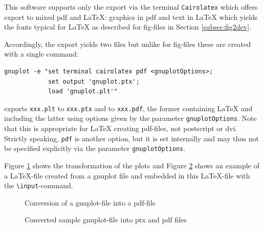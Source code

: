 \documentclass[12pt]{article}
\begin{document}
This software supports only the export via the terminal {\tt Cairolatex} 
which offers export to mixed pdf and \LaTeX: 
graphics in pdf and text in \LaTeX{}
which yields the fonts typical for \LaTeX{} 
as described for fig-files in Section \ref{subsec:fig2dev}. 

Accordingly, the export yields two files 
but unlike for fig-files these are created with a single command: 
%
\begin{verbatim}
gnuplot -e "set terminal cairolatex pdf <gnuplotOptions>;
            set output 'gnuplot.ptx';
            load 'gnuplot.plt'"
\end{verbatim}
%
exports {\tt xxx.plt} to {\tt xxx.ptx} and to {\tt xxx.pdf}, 
the former containing \LaTeX{} and including the latter 
using options given by the parameter {\tt gnuplotOptions}. 
Note that this is appropriate for \LaTeX{} creating pdf-files, 
not postscript or \gls{dvi}. 
Strictly speaking, {\tt pdf} is another option, 
but it is set internally and may thus not be specified 
explicitly via the parameter {\tt gnuplotOptions}. 


Figure \ref{fig:plt2pdf} shows the transformation of the plots 
and Figure \ref{fig:gnuplot} shows an example of a \LaTeX-file 
created from a gnuplot file 
and embedded in this \LaTeX-file with the {\tt\textbackslash input}-command. 

\begin{figure}[htb]
\begin{center}

\end{center}
\caption{\label{fig:plt2pdf}Conversion of a gnuplot-file into a pdf-file}
\end{figure}

\begin{figure}[htb]
\begin{center}

\end{center}
\caption{\label{fig:gnuplot}
Converted sample gnuplot-file into ptx and pdf files }
\end{figure}
\end{document}

